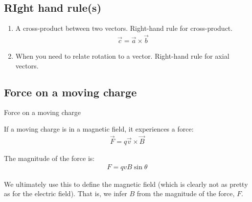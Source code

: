\documentclass[aspectratio=169,
hyperref={colorlinks,urlcolor=blue}
]{beamer}
\begin{document}
\subsection{RIght hand rule(s)}
{
\begin{enumerate}
\item A cross-product between two vectors. Right-hand rule for cross-product.
\begin{align*}%
\vec c = \vec a \times \vec b
\end{align*}%
\vspace{1cm}
\item When you need to relate rotation to a vector. Right-hand rule for axial vectors.
\end{enumerate}
}
{
\vspace{-1cm}
\vspace{-0.5cm}
}



\subsection{Force on a moving charge}
\label{subsec:forceonamovingcharge}
\begin{bulletframe}{Force on a moving charge}
\item If a moving charge is in a magnetic field, it experiences a force:
\begin{align*}
\vec F = q \vec v \times \vec B
\end{align*}
\item The magnitude of the force is:
\begin{align*}
F=qvB\sin\theta
\end{align*}
\item[$\rightarrow$] We ultimately use this to define the magnetic field (which is clearly not as pretty as for the electric field). That is, we infer $B$ from the magnitude of the force, $F$.
\end{bulletframe}




\end{document}
